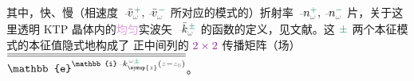 其中，\textcolor{PineGreen}{快}、\textcolor{PineGreen}{慢}（\textcolor{PineGreen}{相速度} $\Xint{\begin{smallmatrix} ~ \\ {}^{}_{\mathcolor{gray}{-}} \\ ~ \end{smallmatrix}}{17}{\bar{v}}_{\mathcolor{gray}{\omega}}^{\;\! \textcolor{PineGreen}{+}}, \Xint{\begin{smallmatrix} ~ \\ {}^{}_{\mathcolor{gray}{-}} \\ ~ \end{smallmatrix}}{17}{\bar{v}}_{\mathcolor{gray}{\omega}}^{\;\! \textcolor{PineGreen}{-}}$ 所对应的\textcolor{PineGreen}{模式}的）\textcolor{PineGreen}{折射率} $\Xint{\begin{smallmatrix} ~ \\ {}^{}_{\mathcolor{gray}{-}} \\ ~ \end{smallmatrix}}{11}{n}^{\textcolor{PineGreen}{+}}_{\mathcolor{gray}{\omega}}, \Xint{\begin{smallmatrix} ~ \\ {}^{}_{\mathcolor{gray}{-}} \\ ~ \end{smallmatrix}}{11}{n}^{\textcolor{PineGreen}{-}}_{\mathcolor{gray}{\omega}}$ 片，关于这里透明 KTP 晶体内的\textcolor{Plum}{均匀}实\textcolor{PineGreen}{波矢} $\Xint{\begin{smallmatrix} ~ \\ {}^{}_{\mathcolor{gray}{-}} \\ ~ \end{smallmatrix}}{15}{\bar{k}}^{\;\! \textcolor{PineGreen}{\pm}}_{\mathcolor{gray}{\omega}}$ 的函数的定义，见文献\cite{berryOpticalSingularitiesBirefringent2003,xieAnalytic3DVector}。这 $\textcolor{PineGreen}{\pm}$ 两个\textcolor{PineGreen}{本征模}式的\textcolor{PineGreen}{本征值}隐式地构成了  正中间列的 $\textcolor{Plum}{2 \times 2}$  \textcolor{PineGreen}{传播矩阵}（场）$\overline{\overline{\mathbb{e}^{\mathbb{i} \Xint{\begin{smallmatrix} ~ \\ {}^{}_{\mathcolor{gray}{-}} \\ ~ \end{smallmatrix}}{15}{k}_{\symup{z}}^{\;\! \mathcolor{gray}{\omega} \textcolor{PineGreen}{\pm}} \left( \mathcolor{gray}{z} - \mathcolor{gray}{z_0} \right)}}}$。

